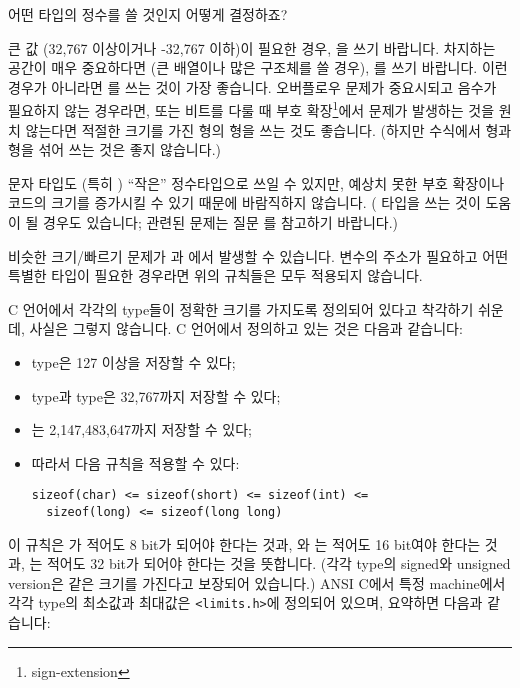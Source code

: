 \begin{faq}
	어떤 타입의 정수를 쓸 것인지 어떻게 결정하죠?

\A
	큰 값 (32,767 이상이거나 -32,767 이하)이 필요한 경우, 을
	쓰기 바랍니다.  차지하는 공간이 매우 중요하다면 (큰 배열이나 많은
	구조체를 쓸 경우), 를 쓰기 바랍니다.  이런 경우가 아니라면
	를 쓰는 것이 가장 좋습니다.  오버플로우 문제가 중요시되고 
	음수가 필요하지 않는 경우라면, 또는 비트를 다룰 때 부호
	확장\footnote{sign-extension}에서 문제가 발생하는 것을 원치 않는다면
	적절한 크기를 가진 형의  형을 쓰는 것도 좋습니다.
	(하지만 수식에서  형과  형을 섞어 쓰는
	것은 좋지 않습니다.)

	문자 타입도 (특히 ) ``작은'' 정수타입으로 쓰일 수
	있지만, 예상치 못한 부호 확장이나 코드의 크기를 증가시킬 수 있기 
	때문에 바람직하지 않습니다.  ( 타입을 쓰는 것이
	도움이 될 경우도 있습니다; 
	관련된 문제는 질문 를 참고하기 바랍니다.)

	비슷한 크기/빠르기 문제가 과 에서 발생할 수 
	있습니다.  변수의 주소가 필요하고 어떤 특별한 타입이 필요한 경우라면 
	위의 규칙들은 모두 적용되지 않습니다.

	C 언어에서 각각의 type들이 정확한 크기를 가지도록 정의되어 있다고
	착각하기 쉬운데, 사실은 그렇지 않습니다.  C 언어에서 정의하고 있는
	것은 다음과 같습니다:

\begin{itemize}
\item
	 type은 127 이상을 저장할 수 있다;
\item
	 type과  type은 32,767까지 저장할 수 있다;
\item
	는 2,147,483,647까지 저장할 수 있다;
\item
	따라서 다음 규칙을 적용할 수 있다:
\begin{verbatim}
sizeof(char) <= sizeof(short) <= sizeof(int) <= 
  sizeof(long) <= sizeof(long long)
\end{verbatim}
\end{itemize}

	이 규칙은 가 적어도 8 bit가 되어야 한다는 것과,
	와 는 적어도 16 bit여야 한다는 것과,
	는 적어도 32 bit가 되어야 한다는 것을
	뜻합니다. (각각 type의 signed와 unsigned version은 같은 크기를
	가진다고 보장되어 있습니다.)
	ANSI C에서 특정 machine에서 
	각각 type의 최소값과 최대값은 \verb+<limits.h>+에 정의되어 있으며,
	요약하면 다음과 같습니다:


\end{faq}
